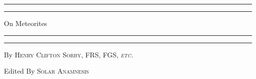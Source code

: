 \documentclass[a4paper, 12pt, oneside]{article}
\begin{document}
\begin{titlepage} %
	\centering %
	\scshape %

	
	\rule{\textwidth}{1.6pt}\vspace*{-\baselineskip}\vspace*{2pt} %
	\rule{\textwidth}{0.4pt} %
	
	\vspace{0.75\baselineskip} %

        {\Huge On Meteorites \\} %
	
	\vspace{0.75\baselineskip} %
	
	\rule{\textwidth}{0.4pt}\vspace*{-\baselineskip}\vspace{3.2pt} %
	\rule{\textwidth}{1.6pt} %
	
	\vspace{1\baselineskip} %
	
	
	{By \scshape\Large Henry Clifton Sorby, FRS, FGS, \emph{etc.}\\} %
	
	\vspace*{1\baselineskip} %
	

 	{Edited By \scshape Solar Anamnesis\\} %

	\vspace{1\baselineskip} %

	
	

\end{titlepage}
\end{document}
